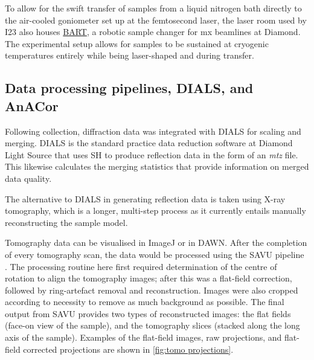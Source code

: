 To allow for the swift transfer of samples from a liquid nitrogen bath directly to the air-cooled goniometer set up at the femtosecond laser, the laser room used by I23 also houses \href{https://www.diamond.ac.uk/Home/Corporate-Literature/Annual-Review/Review2015/Villages/Macromolecular-Crystallography-Village/Macromolecular-Crystallography-Village-Developments/BART---the-new-robotic-sample-changer-for-MX-beamlines-at-Diamond.html}{BART}, a robotic sample changer for \ac{mx} beamlines at Diamond. The experimental setup allows for samples to be sustained at cryogenic temperatures entirely while being laser-shaped and during transfer.

\subsection{Data processing pipelines, DIALS, and AnACor}

Following collection, diffraction data was integrated with DIALS for scaling and merging. DIALS is the standard practice data reduction software at Diamond Light Source that uses SH to produce reflection data in the form of an \textit{mtz} file. This likewise calculates the merging statistics that provide information on merged data quality.%


The alternative to DIALS in generating reflection data is taken using X-ray tomography, which is a longer, multi-step process as it currently entails manually reconstructing the sample model.

Tomography data can be visualised in ImageJ or in DAWN. After the completion of every tomography scan, the data would be processed using the SAVU pipeline \cite{Kazantsev2022}. The processing routine here first required determination of the centre of rotation to align the tomography images; after this was a flat-field correction, followed by ring-artefact removal and reconstruction. Images were also cropped according to necessity to remove as much background as possible. The final output from SAVU provides two types of reconstructed images: the flat fields (face-on view of the sample), and the tomography slices (stacked along the long axis of the sample). Examples of the flat-field images, raw projections, and flat-field corrected projections are shown in \cref{fig:tomo projections}.

